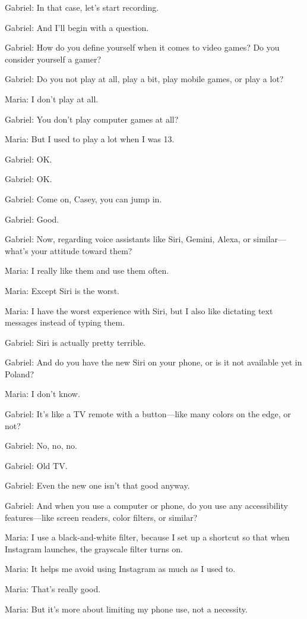 Gabriel: In that case, let’s start recording.

Gabriel: And I’ll begin with a question.

Gabriel: How do you define yourself when it comes to video games? Do you consider yourself a gamer?

Gabriel: Do you not play at all, play a bit, play mobile games, or play a lot?

Maria: I don’t play at all.

Gabriel: You don’t play computer games at all?

Maria: But I used to play a lot when I was 13.

Gabriel: OK.

Gabriel: OK.

Gabriel: Come on, Casey, you can jump in.

Gabriel: Good.

Gabriel: Now, regarding voice assistants like Siri, Gemini, Alexa, or similar—what’s your attitude toward them?

Maria: I really like them and use them often.

Maria: Except Siri is the worst.

Maria: I have the worst experience with Siri, but I also like dictating text messages instead of typing them.

Gabriel: Siri is actually pretty terrible.

Gabriel: And do you have the new Siri on your phone, or is it not available yet in Poland?

Maria: I don’t know.

Gabriel: It’s like a TV remote with a button—like many colors on the edge, or not?

Gabriel: No, no, no.

Gabriel: Old TV.

Gabriel: Even the new one isn’t that good anyway.

Gabriel: And when you use a computer or phone, do you use any accessibility features—like screen readers, color filters, or similar?

Maria: I use a black-and-white filter, because I set up a shortcut so that when Instagram launches, the grayscale filter turns on.

Maria: It helps me avoid using Instagram as much as I used to.

Maria: That’s really good.

Maria: But it’s more about limiting my phone use, not a necessity.

